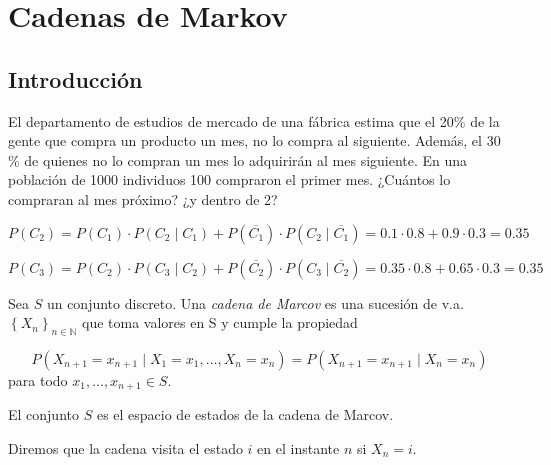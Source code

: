 \documentclass[PREyA.tex]{subfiles}
\begin{document}
\chapter{Cadenas de Markov}
\section{Introducción}

\begin{example} El departamento de estudios de mercado de una fábrica estima que el 20$ \% $ de la gente que compra un producto un mes, no lo compra al siguiente. Además, el 30$\%$ de quienes no lo compran un mes lo adquirirán al mes siguiente. En una población de 1000 individuos 100 compraron el primer mes. ¿Cuántos lo compraran al mes próximo? ¿y dentro de 2?


\begin{equation*}
 P(C_{2}) = P(C_{1}) \cdot P(C_{2}\mid C_{1} ) + P(\overline{C_{1}}) \cdot P(C_{2}\mid \overline{C_{1}} ) = 0.1 \cdot 0.8 + 0.9 \cdot 0.3 = 0.35
\end{equation*}

\begin{equation*}
 P(C_{3}) = P(C_{2}) \cdot P(C_{3}\mid C_{2} ) + P(\overline{C_{2}}) \cdot P(C_{3}\mid \overline{C_{2}} ) = 0.35 \cdot 0.8 + 0.65 \cdot 0.3 = 0.35
\end{equation*}

\end{example}
\begin{defi}
	Sea $S$ un conjunto discreto. Una \textit{cadena de Marcov} es una sucesión de v.a. $\left\lbrace X_{n}\right\rbrace _{n \in \mathbb{N}}$ que toma valores en S y cumple la propiedad
	
	\begin{equation*}
	P(X_{n+1}=x_{n+1} \mid  X_{1}=x_{1},\dotsc ,X_{n}=x_{n}) = P(X_{n+1}=x_{n+1}\mid X_{n}=x_{n})
	\end{equation*}
	para todo $x_{1},\dotsc ,x_{n+1}\in S$.
	
\end{defi}

\begin{nota}
El conjunto $S$ es el espacio de estados de la cadena de Marcov.	
\end{nota}
\begin{defi}
Diremos que la cadena visita el estado $i$ en el instante $n$ si $X_{n}=i$.
\end{defi}
\end{document}
